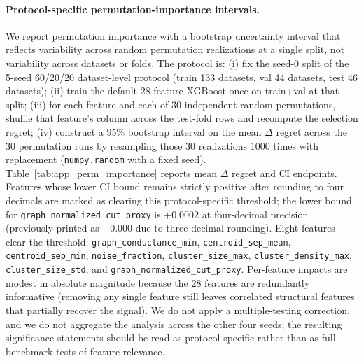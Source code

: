 \documentclass[10pt]{article} %
\begin{document}
\paragraph{Protocol-specific permutation-importance intervals.} We report permutation importance with a bootstrap uncertainty interval that reflects variability across random permutation realizations at a single split, not variability across datasets or folds. The protocol is: (i) fix the seed-0 split of the 5-seed 60/20/20 dataset-level protocol (train 133 datasets, val 44 datasets, test 46 datasets); (ii) train the default 28-feature XGBoost once on train+val at that split; (iii) for each feature and each of 30 independent random permutations, shuffle that feature's column across the test-fold rows and recompute the selection regret; (iv) construct a 95\% bootstrap interval on the mean $\Delta$ regret across the 30 permutation runs by resampling those 30 realizations 1000 times with replacement (\texttt{numpy.random} with a fixed seed). Table~\ref{tab:app_perm_importance} reports mean $\Delta$ regret and CI endpoints. Features whose lower CI bound remains strictly positive after rounding to four decimals are marked as clearing this protocol-specific threshold; the lower bound for \texttt{graph\_normalized\_cut\_proxy} is $+0.0002$ at four-decimal precision (previously printed as $+0.000$ due to three-decimal rounding). Eight features clear the threshold: \texttt{graph\_conductance\_min}, \texttt{centroid\_sep\_mean}, \texttt{centroid\_sep\_min}, \texttt{noise\_fraction}, \texttt{cluster\_size\_max}, \texttt{cluster\_density\_max}, \texttt{cluster\_size\_std}, and \texttt{graph\_normalized\_cut\_proxy}. Per-feature impacts are modest in absolute magnitude because the 28 features are redundantly informative (removing any single feature still leaves correlated structural features that partially recover the signal). We do not apply a multiple-testing correction, and we do not aggregate the analysis across the other four seeds; the resulting significance statements should be read as protocol-specific rather than as full-benchmark tests of feature relevance.
\end{document}
